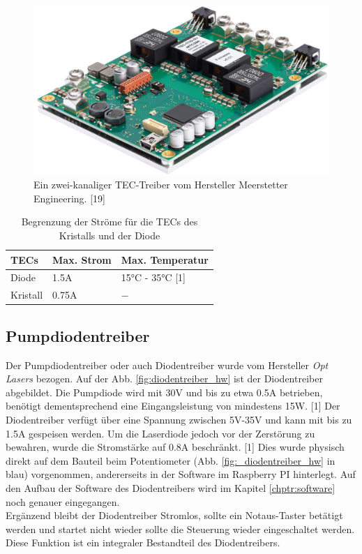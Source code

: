 \begin{figure}[H]
    \centering
    \includegraphics[scale=0.2]{98_images/tec_controller_real_isometry_meerstetter.PNG}
    \caption{Ein zwei-kanaliger TEC-Treiber vom Hersteller Meerstetter Engineering. [19]}
    \label{fig:_tec_treiber_hw}
\end{figure}

\begin{table}[H]
    \centering
    \begin{tabular}{l|l|l}
         \textbf{TECs}& \textbf{Max. Strom}&    \textbf{Max. Temperatur} \\
         \hline
         Diode&         1.5A&                   15°C - 35°C [1]\\
         Kristall&      0.75A&                  $-$
    \end{tabular}
    \caption{Begrenzung der Ströme für die TECs des Kristalls und der Diode}
    \label{tab:_tec_a_limit}
\end{table}

\subsection{Pumpdiodentreiber}
\label{chptr:_diodentreiber}
Der Pumpdiodentreiber oder auch Diodentreiber wurde vom Hersteller \textit{Opt Lasers} bezogen. Auf der Abb. \ref{fig:diodentreiber_hw} ist der Diodentreiber abgebildet. Die Pumpdiode wird mit 30V und bis zu etwa 0.5A betrieben, benötigt dementsprechend eine Eingangsleistung von mindestens 15W. [1] Der Diodentreiber verfügt über eine Spannung zwischen 5V-35V und kann mit bis zu 1.5A gespeisen werden. Um die Laserdiode jedoch vor der Zerstörung zu bewahren, wurde die Stromstärke auf 0.8A beschränkt. [1] Dies wurde physisch direkt auf dem Bauteil beim Potentiometer (Abb. \ref{fig:_diodentreiber_hw} in blau) vorgenommen, andererseits in der Software im Raspberry PI hinterlegt. Auf den Aufbau der Software des Diodentreibers wird im Kapitel \ref{chptr:software} noch genauer eingegangen.\\
Ergänzend bleibt der Diodentreiber Stromlos, sollte ein Notaus-Taster betätigt werden und startet nicht wieder sollte die Steuerung wieder eingeschaltet werden. Diese Funktion ist ein integraler Bestandteil des Diodentreibers.

